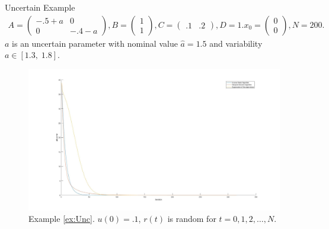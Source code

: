 \begin{exam}
	\label{ex:Unc}
	Uncertain Example
	\begin{align}
	A = \begin{pmatrix}
	-.5 + a & 0 \\ 0 & -.4-a
	\end{pmatrix}, 
	B = \begin{pmatrix}
	1 \\ 1
	\end{pmatrix}, 
	C = \begin{pmatrix}
	.1 & .2
	\end{pmatrix},
	D = 1. x_0 = \begin{pmatrix}
	0 \\ 0
	\end{pmatrix}, N = 200. 
	\end{align}
	$a$ is an uncertain parameter with nominal value $\hat{a} = 1.5$ and variability $a \in [1.3, \; 1.8]$.
	\begin{figure}[ht]
		\includegraphics[width=\textwidth]{fig/Ex2.jpg}
		\caption{Example \ref{ex:Unc}. $u(0) = .1$, $r(t)$ is random for $t = 0, 1, 2, \dots, N$.}
	\end{figure}	
\end{exam}